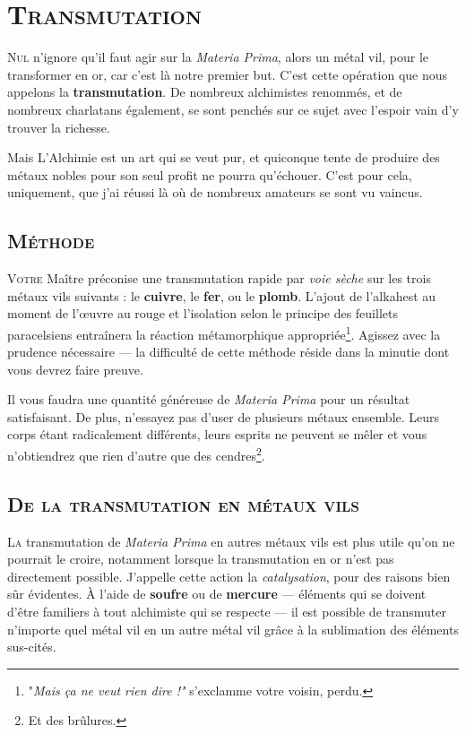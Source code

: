 \section{\textsc{Transmutation}}

\lettrine{N}{ul} n'ignore qu'il faut agir sur la \emph{Materia Prima}, alors un métal vil,
pour le transformer en or, car c'est là notre premier but. C'est cette
opération que nous appelons la \textbf{transmutation}. De nombreux
alchimistes renommés, et de nombreux charlatans également, se sont penchés sur
ce sujet avec l'espoir vain d'y trouver la richesse.

Mais L'Alchimie est un art qui se veut pur, et quiconque tente de produire
des métaux nobles pour son seul profit ne pourra qu'échouer. C'est pour cela,
uniquement, que j'ai réussi là où de nombreux amateurs se sont vu vaincus.

\subsection{\textsc{Méthode}}

\lettrine{V}{otre} Maître préconise une transmutation rapide par \emph{voie sèche} sur
les trois métaux vils suivants : le \textbf{cuivre}, le \textbf{fer}, ou le
\textbf{plomb}. L'ajout de l'alkahest au moment de l'œuvre au rouge et
l'isolation selon le principe des feuillets paracelsiens entraînera la réaction
métamorphique appropriée\footnote{"\textit{Mais ça ne veut rien dire !"}
s'exclamme votre voisin, perdu.}.
Agissez avec la prudence nécessaire — la difficulté de cette méthode réside dans la
minutie dont vous devrez faire preuve.

Il vous faudra une quantité généreuse de \emph{Materia Prima} pour un résultat
satisfaisant. De plus, n'essayez pas d'user de plusieurs métaux ensemble. Leurs
corps étant radicalement différents, leurs esprits ne peuvent se mêler et vous
n'obtiendrez que rien d'autre que des cendres\footnote{Et des brûlures.}.

\subsection{\textsc{De la transmutation en métaux vils}}

\lettrine{L}{a} transmutation de \emph{Materia Prima} en autres métaux vils est plus utile
qu'on ne pourrait le croire, notamment lorsque la transmutation en or n'est pas
directement possible. J'appelle cette action la \emph{catalysation}, pour des
raisons bien sûr évidentes. À l'aide de \textbf{soufre} ou de \textbf{mercure} —
éléments qui se doivent d'être familiers à tout alchimiste qui se respecte — il
est possible de transmuter n'importe quel métal vil en un autre métal vil grâce
à la sublimation des éléments sus-cités.

